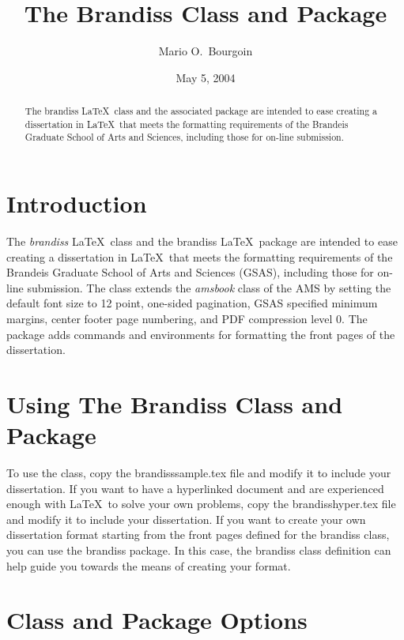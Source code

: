 \documentclass[12pt]{article}
\begin{document}
\title{The Brandiss Class and Package}
\author{Mario O.~Bourgoin}
\date{May 5, 2004}

\maketitle

\begin{abstract}
  The brandiss \LaTeX\ class and the associated package are intended
  to ease creating a dissertation in \LaTeX\ that meets the formatting
  requirements of the Brandeis Graduate School of Arts and Sciences,
  including those for on-line submission.
\end{abstract}

\section{Introduction}

The \emph{brandiss} \LaTeX\ class and the brandiss \LaTeX\ package are
intended to ease creating a dissertation in \LaTeX\ that meets the
formatting requirements of the Brandeis Graduate School of Arts and
Sciences (GSAS), including those for on-line submission.  The class
extends the \emph{amsbook} class of the AMS by setting the default
font size to 12 point, one-sided pagination, GSAS specified minimum
margins, center footer page numbering, and PDF compression level 0.
The package adds commands and environments for formatting the front
pages of the dissertation.

\section{Using The Brandiss Class and Package}

To use the class, copy the brandisssample.tex file and modify it to
include your dissertation.  If you want to have a hyperlinked document
and are experienced enough with \LaTeX\ to solve your own problems,
copy the brandisshyper.tex file and modify it to include your
dissertation.  If you want to create your own dissertation format
starting from the front pages defined for the brandiss class, you can
use the brandiss package.  In this case, the brandiss class definition
can help guide you towards the means of creating your format.

\section{Class and Package Options}
\end{document}
